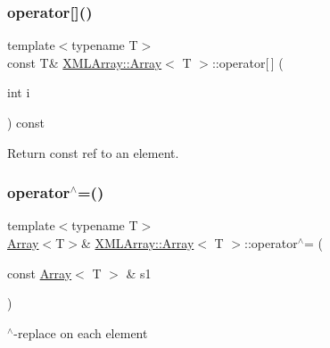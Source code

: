 \mbox{\label{classXMLArray_1_1Array_a8e51d308c4e6b81cdbf1be40377afda8}} 
\subsubsection{\texorpdfstring{operator[]()}{operator[]()}\hspace{0.1cm}{\footnotesize\ttfamily [6/6]}}
{\footnotesize\ttfamily template$<$typename T$>$ \\
const T\& \mbox{\hyperlink{classXMLArray_1_1Array}{X\+M\+L\+Array\+::\+Array}}$<$ T $>$\+::operator\mbox{[}$\,$\mbox{]} (\begin{DoxyParamCaption}\item[{int}]{i }\end{DoxyParamCaption}) const\hspace{0.3cm}{\ttfamily [inline]}}



Return const ref to an element. 

\mbox{\label{classXMLArray_1_1Array_a8e2621caf3277b85e6898a3eceb9b233}} 
\subsubsection{\texorpdfstring{operator$^\wedge$=()}{operator^=()}\hspace{0.1cm}{\footnotesize\ttfamily [1/6]}}
{\footnotesize\ttfamily template$<$typename T$>$ \\
\mbox{\hyperlink{classXMLArray_1_1Array}{Array}}$<$T$>$\& \mbox{\hyperlink{classXMLArray_1_1Array}{X\+M\+L\+Array\+::\+Array}}$<$ T $>$\+::operator$^\wedge$= (\begin{DoxyParamCaption}\item[{const \mbox{\hyperlink{classXMLArray_1_1Array}{Array}}$<$ T $>$ \&}]{s1 }\end{DoxyParamCaption})\hspace{0.3cm}{\ttfamily [inline]}}



$^\wedge$-\/replace on each element 

